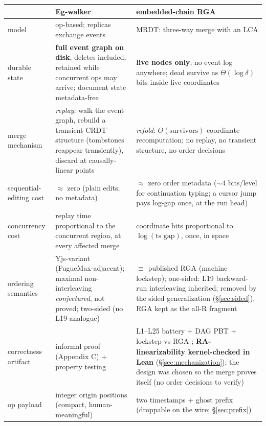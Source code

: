 \documentclass[11pt]{article}
\begin{document}
\begin{center}\small
\begin{tabular}{@{}p{}p{}p{}@{}}
\toprule
 & Eg-walker & embedded-chain RGA \\
\midrule
model & op-based; replicas exchange events & MRDT: three-way merge
  with an LCA \\
durable state & \textbf{full event graph on disk}, deletes included,
  retained while concurrent ops may arrive; document state
  metadata-free & \textbf{live nodes only}; no event log anywhere;
  dead survive as $\Theta(\log\delta)$ bits inside live coordinates \\
merge mechanism & \emph{replay}: walk the event graph, rebuild a
  transient CRDT structure (tombstones reappear transiently), discard
  at causally-linear points & \emph{refold}: $O(\text{survivors})$
  coordinate recomputation; no replay, no transient structure, no
  order decisions \\
sequential-editing cost & $\approx$ zero (plain edits; no metadata) &
  $\approx$ zero order metadata ($\sim$4 bits/level for continuation
  typing; a cursor jump pays log-gap once, at the run head) \\
concurrency cost & replay time proportional to the concurrent region,
  at every affected merge & coordinate bits proportional to
  $\log(\text{ts gap})$, once, in space \\
ordering semantics & Yjs-variant (FugueMax-adjacent); maximal
  non-interleaving \emph{conjectured}, not proved; two-sided (no L19
  analogue) & $\equiv$ published RGA (machine lockstep); one-sided:
  L19 backward-run interleaving inherited; removed by the sided
  generalization (\S\ref{sec:sided}), RGA kept as the all-R
  fragment \\
correctness artifact & informal proof (Appendix C) + property testing
  & L1--L25 battery + DAG PBT + lockstep vs RGA$_\dagger$;
  \textbf{RA-linearizability kernel-checked in Lean}
  (\S\ref{sec:mechanization}); the design was
  chosen so the merge proves itself (no order decisions to verify) \\
op payload & integer origin positions (compact, human-meaningful) &
  two timestamps + ghost prefix (droppable on the wire;
  \S\ref{sec:prefix}) \\
\bottomrule
\end{tabular}
\end{center}
\end{document}
